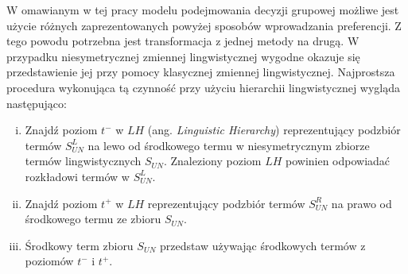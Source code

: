 W omawianym w tej pracy modelu podejmowania decyzji grupowej możliwe jest użycie
różnych zaprezentowanych powyżej sposobów wprowadzania preferencji. Z tego
powodu potrzebna jest transformacja z jednej metody na drugą. W przypadku
niesymetrycznej zmiennej lingwistycznej wygodne okazuje się przedstawienie jej
przy pomocy klasycznej zmiennej lingwistycznej. Najprostsza procedura wykonująca
tą czynność przy użyciu hierarchii lingwistycznej wygląda następująco:
\begin{enumerate}[i.]
  \item Znajdź poziom $t^-$ w $LH$ (ang. \textit{Linguistic Hierarchy})
  reprezentujący podzbiór termów $S^L_{UN}$ na lewo od środkowego termu w niesymetrycznym
  zbiorze termów lingwistycznych $S_{UN}$. Znaleziony poziom $LH$ powinien
  odpowiadać rozkładowi termów w $S^L_{UN}.$
  \item Znajdź poziom $t^+$ w $LH$ reprezentujący podzbiór termów $S^R_{UN}$ na
  prawo od środkowego termu ze zbioru $S_{UN}.$
  \item Środkowy term zbioru $S_{UN}$ przedstaw używając środkowych
  termów z poziomów $t^-$ i $t^+.$
\end{enumerate}

